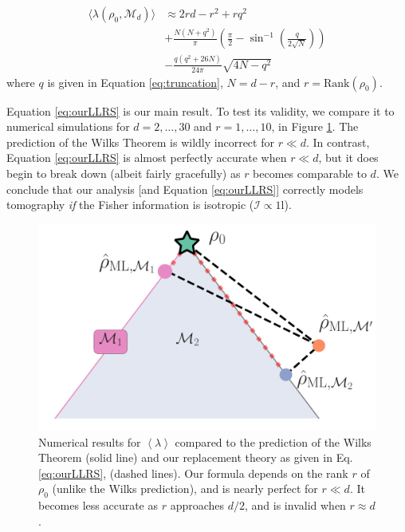 \documentclass[aps,pra, twocolumn]{revtex4}
\newcommand{\M}{\mathcal{M}}
\newcommand{\expect}[1]{\ensuremath{\left\langle#1\right\rangle}}
\def\Id{1\!\mathrm{l}}
\newcommand{\Fi}{\mathcal{I}}
\begin{document}
\begin{align}
\label{eq:ourLLRS}
\nonumber \langle \lambda(\rho_{0}, \M_{d}) \rangle &\approx 2rd - r^{2}+rq^{2}\\
\nonumber &+  \frac{N(N+q^2)}{\pi} \left( \frac{\pi}{2} - \sin^{-1}\left(\frac{q}{{2\sqrt{N}}}\right)\right)\\
& - \frac{q(q^2+26N)}{24\pi} \sqrt{4N-q^2}
\end{align}
where $q$ is given in Equation \eqref{eq:truncation}, $N=d-r$, and $r = \mathrm{Rank}(\rho_{0})$.

Equation \eqref{eq:ourLLRS} is our main result.  To test its validity, we compare it to numerical simulations for $d=2,\ldots,30$ and $r=1,\ldots,10$, in Figure \ref{fig:modelcomp-iso}.  The prediction of the Wilks Theorem is wildly incorrect for $r\ll d$. In contrast, Equation \ref{eq:ourLLRS} is almost perfectly accurate when $r \ll d$, but it does begin to break down (albeit fairly gracefully) as $r$ becomes comparable to $d$.  We conclude that our analysis [and Equation \eqref{eq:ourLLRS}] correctly models tomography \emph{if} the Fisher information is isotropic ($\Fi \propto \Id$).

\begin{figure}[h]
 \includegraphics[width=\columnwidth]{Images/Figure_3.pdf}
 \caption{Numerical results for $\expect{\lambda}$ compared to the prediction of the Wilks Theorem (solid line) and our replacement theory as given in Eq. \ref{eq:ourLLRS}, (dashed lines).  Our formula depends on the rank $r$ of $\rho_0$ (unlike the Wilks prediction), and is nearly perfect for $r\ll d$.  It becomes less accurate as $r$ approaches $d/2$, and is invalid when $r\approx d$.}
 \label{fig:modelcomp-iso}
\end{figure}
\end{document}
